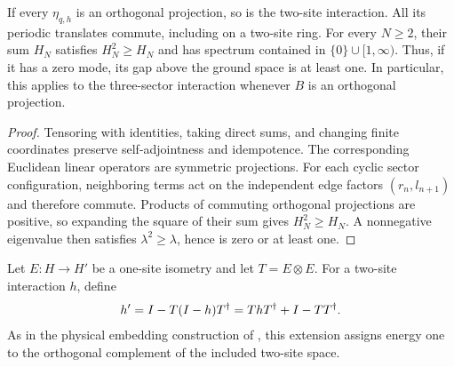 \begin{lemma}
    \label{thm:spt_sector_bond_gap}
    \leanok
    If every $\eta_{q,h}$ is an orthogonal projection, so is the
    two-site interaction. All its periodic translates commute,
    including on a two-site ring. For every $N\ge2$, their sum
    $H_N$ satisfies $H_N^2\ge H_N$ and has spectrum contained in
    $\{0\}\cup[1,\infty)$. Thus, if it has a zero mode, its
    gap above the ground space is at least one.
    In particular, this applies to the three-sector interaction
    whenever $B$ is an orthogonal projection.
\end{lemma}

\begin{proof}\leanok
    Tensoring with identities, taking direct sums, and changing
    finite coordinates preserve self-adjointness and idempotence.
    The corresponding Euclidean linear operators are symmetric projections.
    For each cyclic sector configuration, neighboring terms act on
    the independent edge factors $(r_n,l_{n+1})$ and therefore commute.
    Products of commuting orthogonal projections are positive, so
    expanding the square of their sum gives $H_N^2\ge H_N$.
    A nonnegative eigenvalue then satisfies $\lambda^2\ge\lambda$,
    hence is zero or at least one.
\end{proof}

\begin{definition}
    \label{def:spt_isometric_interaction_extension}
    \leanok
    Let $E:H\to H'$ be a one-site isometry and let $T=E\otimes E$.
    For a two-site interaction $h$, define
    \begin{align}
        h'=I-T(I-h)T^\dagger
        =ThT^\dagger+I-TT^\dagger.
        \notag
    \end{align}
    As in the physical embedding construction of
    \cite[Section~II.F.2]{Schuch2011Phases}, this extension assigns energy
    one to the orthogonal complement of the included two-site space.
\end{definition}

